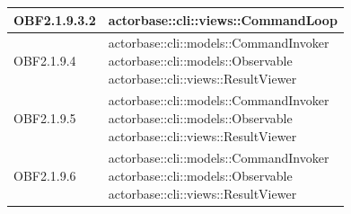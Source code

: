 \documentclass{scalatekids-article}
\begin{document}
\begin{longtable}[H]{|p{5cm}|p{12cm}|}
\hline
OBF2.1.9.3.2 & \multiLineCell[t]{actorbase::cli::views::CommandLoop\\}\\
\hline
OBF2.1.9.4 & \multiLineCell[t]{actorbase::cli::models::CommandInvoker\\actorbase::cli::models::Observable\\actorbase::cli::views::ResultViewer\\}\\
\hline
OBF2.1.9.5 & \multiLineCell[t]{actorbase::cli::models::CommandInvoker\\actorbase::cli::models::Observable\\actorbase::cli::views::ResultViewer\\}\\
\hline
OBF2.1.9.6 & \multiLineCell[t]{actorbase::cli::models::CommandInvoker\\actorbase::cli::models::Observable\\actorbase::cli::views::ResultViewer\\}\\
\hline
\end{longtable}


\newpage
\appendix
\label{sec:appendice}

\newpage
\listoffigures
\end{document}
